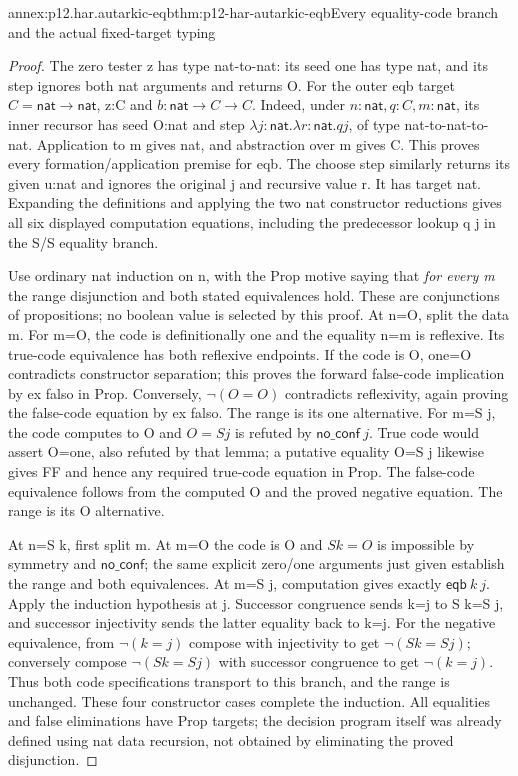 \begin{annexitem}{annex:p12.har.autarkic-eqb}{thm:p12-har-autarkic-eqb}{Every equality-code branch and the actual fixed-target typing}
\begin{proof}
The zero tester z has type nat-to-nat: its seed one has type nat,
and its step ignores both nat arguments and returns O. For the outer
eqb target \(C=\mathsf{nat}\to\mathsf{nat}\), z:C and
\(b:\mathsf{nat}\to C\to C\). Indeed, under
\(n:\mathsf{nat},q:C,m:\mathsf{nat}\), its inner recursor has seed
O:nat and step \(\lambda j:\mathsf{nat}.\lambda r:\mathsf{nat}.q j\),
of type nat-to-nat-to-nat. Application to m gives nat, and abstraction
over m gives C. This proves every formation/application premise for
eqb. The choose step similarly returns its given u:nat and ignores
the original j and recursive value r. It has target nat. Expanding
the definitions and applying the two nat constructor reductions gives
all six displayed computation equations, including the predecessor
lookup q j in the S/S equality branch.

Use ordinary nat induction on n, with the Prop motive saying that
\emph{for every m} the range disjunction and both stated equivalences
hold. These are conjunctions of propositions; no boolean value is
selected by this proof. At n=O, split the data m.
For m=O, the code is definitionally one and the equality n=m is
reflexive. Its true-code equivalence has both reflexive endpoints.
If the code is O, one=O contradicts constructor separation; this
proves the forward false-code implication by ex falso in Prop.
Conversely, \(\neg(O=O)\) contradicts reflexivity, again proving
the false-code equation by ex falso. The range is its one alternative.
For m=S j, the code computes to O and \(O=S j\) is refuted by
\(\mathsf{no\_conf}\ j\). True code would assert O=one, also
refuted by that lemma; a putative equality O=S j likewise gives FF
and hence any required true-code equation in Prop. The false-code
equivalence follows from the computed O and the proved negative
equation. The range is its O alternative.

At n=S k, first split m. At m=O the code is O and \(S k=O\)
is impossible by symmetry and \(\mathsf{no\_conf}\); the same explicit zero/one
arguments just given establish the range and both equivalences.
At m=S j, computation gives exactly \(\mathsf{eqb}\ k\ j\).
Apply the induction hypothesis at j. Successor congruence sends
k=j to S k=S j, and successor injectivity sends the latter equality
back to k=j. For the negative equivalence, from \(\neg(k=j)\)
compose with injectivity to get \(\neg(S k=S j)\); conversely
compose \(\neg(S k=S j)\) with successor congruence to get
\(\neg(k=j)\). Thus both code specifications transport to this
branch, and the range is unchanged. These four constructor cases
complete the induction. All equalities and false eliminations have
Prop targets; the decision program itself was already defined using
nat data recursion, not obtained by eliminating the proved disjunction.
\end{proof}
\end{annexitem}

